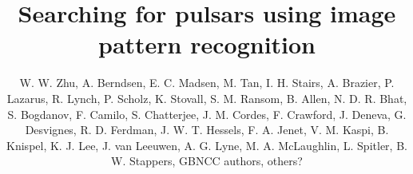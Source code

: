 \documentclass[12pt,preprint]{aastex}
\begin{document}
\title{Searching for pulsars using image pattern recognition}

\author{W. W. Zhu,
A. Berndsen,
E. C. Madsen,
M. Tan,
I. H. Stairs,
A. Brazier,
P. Lazarus,
R. Lynch,
P. Scholz,
K. Stovall,
S. M. Ransom,
B. Allen,
N. D. R. Bhat,
S. Bogdanov,
F. Camilo,
S. Chatterjee,
J. M. Cordes,
F. Crawford,
J. Deneva,
G. Desvignes,
R. D. Ferdman,
J. W. T. Hessels,
F. A. Jenet,
V. M. Kaspi,
B. Knispel,
K. J. Lee,
J. van Leeuwen,
A. G. Lyne,
M. A. McLaughlin,
L. Spitler,
B. W. Stappers,
GBNCC authors,
others?
}






\acknowledgements


%



%

\end{document}
